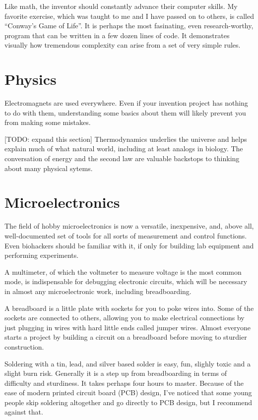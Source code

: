 \documentclass[
	fontsize=10pt, %
	twoside=false, %
	secnumdepth=1, %
]{kaobook}
\begin{document}
Like math, the inventor should constantly advance their computer skills.
My favorite exercise, which was taught to me  and I have passed on to others,
is called ``Conway's Game of Life''. It is perhaps the most fasinating,
even research-worthy,
program that can be written in a few dozen lines of code.
It demonstrates visually how tremendous complexity can arise from a set
of very simple rules.

\section{Physics}

Electromagnets are used everywhere. Even if your invention project has nothing
to do with them, understanding some basics about them will likely prevent
you from making some mistakes.

[TODO: expand this section]
Thermodynamics underlies the universe and helps explain much of what natural
world, including at least analogs in biology. The conversation of energy
and the second law are valuable backstops to thinking about many physical
sytems.

\section{Microelectronics}

The field of hobby microelectronics is now a versatile, inexpensive,
and, above all, well-documented set of tools for all sorts of measurement
and control functions.
Even biohackers should be familiar with it, if only for building
lab equipment and performing experiments.

A multimeter, of which the voltmeter to measure voltage is the most
common mode, is indispensable for debugging electronic circuits,
which will be necessary in almost any microelectronic work,
including breadboarding.

A breadboard is a little plate with sockets for you to poke wires
into. Some of the sockets are connected to others, allowing you to
make electrical connections by just plugging in wires with hard little
ends called jumper wires. Almost everyone starts a project
by building a circuit on a breadboard before moving to sturdier construction.

Soldering with a tin, lead, and silver based solder
is easy, fun, slighly toxic and a slight burn risk.
Generally it is a step up from breadboarding in terms of difficulty and
sturdiness. It takes perhaps four hours to master.
Because of the ease of modern printed circuit board (PCB) design,
I've noticed that some young people skip soldering altogether and
go directly to PCB design, but I recommend against that.
\end{document}
